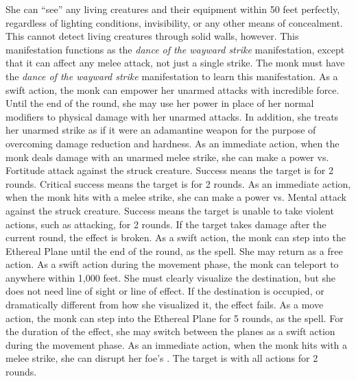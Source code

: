    She can ``see'' any living creatures and their equipment within 50 feet perfectly, regardless of lighting conditions, invisibility, or any other means of concealment.
    This cannot detect living creatures through solid walls, however.
    This \ki manifestation functions as the \textit{dance of the wayward strike} manifestation, except that it can affect any melee attack, not just a single strike.
    The monk must have the \textit{dance of the wayward strike} \ki manifestation to learn this manifestation.
    As a swift action, the monk can empower her unarmed attacks with incredible force.
    Until the end of the round, she may use her \ki power in place of her normal modifiers to physical damage with her unarmed attacks.
    In addition, she treats her unarmed strike as if it were an adamantine weapon for the purpose of overcoming damage reduction and hardness.
    As an immediate action, when the monk deals damage with an unarmed melee strike, she can make a \Ki power vs. Fortitude attack against the struck creature.
    Success means the target is \staggered for 2 rounds.
    Critical success means the target is \stunned for 2 rounds.
    \norepeatnotes
    As an immediate action, when the monk hits with a melee strike, she can make a \Ki power vs. Mental attack against the struck creature.
    Success means the target is unable to take violent actions, such as attacking, for 2 rounds.
    If the target takes damage after the current round, the effect is broken.
    As a swift action, the monk can step into the Ethereal Plane until the end of the round, as the  spell.
    She may return as a free action.
    As a swift action during the movement phase, the monk can teleport to anywhere within 1,000 feet.
    She must clearly visualize the destination, but she does not need line of sight or line of effect.
    If the destination is occupied, or dramatically different from how she visualized it, the effect fails.
     As a move action, the monk can step into the Ethereal Plane for 5 rounds, as the 
    spell.
    For the duration of the effect, she may switch between the planes as a swift action during the movement phase.
    As an immediate action, when the monk hits with a melee strike, she can disrupt her foe's \ki.
    The target is \severelyimpaired with all actions for 2 rounds.

